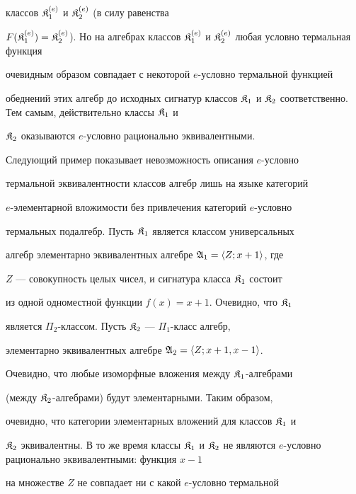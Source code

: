 \begin{pf}
классов $\frak K^{(e)}_1$ и $\frak K^{(e)}_2$ (в силу равенства 


$F(\frak K^{(e)}_1)=\frak K^{(e)}_2$). Но на алгебрах классов $\frak 


K^{(e)}_1$ и $\frak K^{(e)}_2$ любая условно термальная функция 


очевидным образом совпадает с некоторой $e$-условно термальной функцией 


обеднений этих алгебр до исходных сигнатур классов $\frak K_1$ и $\frak 


K_2$ соответственно. Тем самым, действительно классы $\frak K_1$ и 


$\frak K_2$ оказываются $e$-условно рационально эквивалентными. 


\end{pf} 


 


Следующий пример показывает невозможность описания $e$-условно 


термальной эквивалентности классов алгебр лишь на языке категорий 


$e$-элементарной вложимости без привлечения категорий $e$-условно 


термальных подалгебр. Пусть $\frak K_1$ является классом универсальных 


алгебр элементарно эквивалентных алгебре $\frak A_1=\langle Z;x+1\rangle$, где 


$Z$ --- совокупность целых чисел, и сигнатура класса $\frak K_1$ состоит 


из одной одноместной функции $f(x)=x+1$. Очевидно, что $\frak K_1$ 


является $\Pi_2$-классом. Пусть $\frak K_2$ --- $\Pi_1$-класс алгебр, 


элементарно эквивалентных алгебре $\frak A_2=\langle Z;x+1,x-1\rangle$. 


Очевидно, что любые изоморфные вложения между $\frak K_1$-алгебрами 


(между $\frak K_2$-алгебрами) будут элементарными. Таким образом, 


очевидно, что категории элементарных вложений для классов $\frak K_1$ и 


$\frak K_2$ эквивалентны. В то же время классы $\frak K_1$ и $\frak 


K_2$ не являются $e$-условно рационально эквивалентными: функция $x-1$ 


на множестве $Z$ не совпадает ни с какой $e$-условно термальной 


